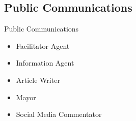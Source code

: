 \subsection{Public Communications}
\begin{frame}{Public Communications}
    \begin{itemize}
        \item Facilitator Agent
        \item Information Agent
        \item Article Writer
        \item Mayor
        \item Social Media Commentator
    \end{itemize}
\end{frame} 